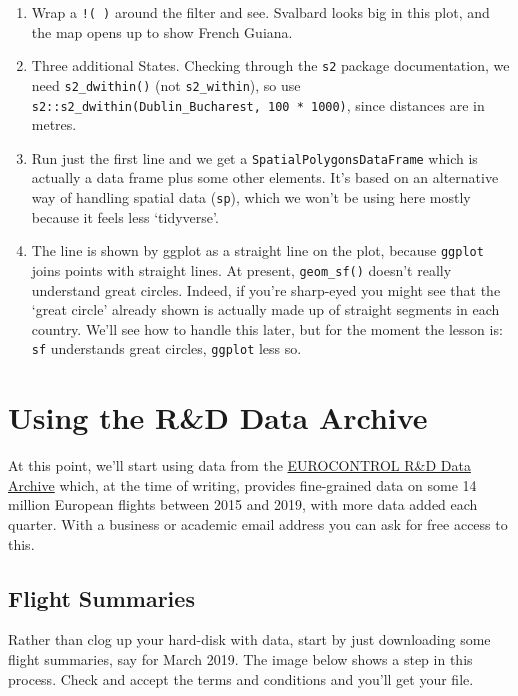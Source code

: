 \documentclass[
]{book}
\providecommand{\tightlist}{%
  \setlength{\itemsep}{0pt}\setlength{\parskip}{0pt}}
\begin{document}
\begin{enumerate}
\def\labelenumi{\arabic{enumi})}
\tightlist
\item
  Wrap a \texttt{!(\ )} around the filter and see. Svalbard looks big in this plot, and the map opens up to show French Guiana.
\item
  Three additional States. Checking through the \texttt{s2} package documentation, we need \texttt{s2\_dwithin()} (not \texttt{s2\_within}), so use \texttt{s2::s2\_dwithin(Dublin\_Bucharest,\ 100\ *\ 1000)}, since distances are in metres.
\item
  Run just the first line and we get a \texttt{SpatialPolygonsDataFrame} which is actually a data frame plus some other elements. It's based on an alternative way of handling spatial data (\texttt{sp}), which we won't be using here mostly because it feels less `tidyverse'.
\item
  The line is shown by ggplot as a straight line on the plot, because \texttt{ggplot} joins points with straight lines. At present, \texttt{geom\_sf()} doesn't really understand great circles. Indeed, if you're sharp-eyed you might see that the `great circle' already shown is actually made up of straight segments in each country. We'll see how to handle this later, but for the moment the lesson is: \texttt{sf} understands great circles, \texttt{ggplot} less so.
\end{enumerate}

\hypertarget{RnDArchive}{%
\section{Using the R\&D Data Archive}\label{RnDArchive}}

At this point, we'll start using data from the \href{https://www.eurocontrol.int/dashboard/rnd-data-archive}{EUROCONTROL R\&D Data Archive} which, at the time of writing, provides fine-grained data on some 14 million European flights between 2015 and 2019, with more data added each quarter. With a business or academic email address you can ask for free access to this.

\hypertarget{flight-summaries}{%
\subsection{Flight Summaries}\label{flight-summaries}}

Rather than clog up your hard-disk with data, start by just downloading some flight summaries, say for March 2019. The image below shows a step in this process. Check and accept the terms and conditions and you'll get your file.
\end{document}
